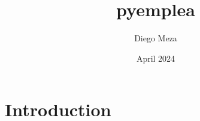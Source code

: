 \documentclass{article}
\title{pyemplea}
\author{Diego Meza}
\date{April 2024}
\begin{document}
\maketitle

\section{Introduction}
\end{document}

